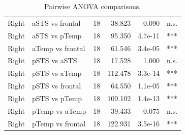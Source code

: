 \begin{table}[h]
\begin{tabular}{llrrrl}
 Right        & aSTS vs frontal  &   18 &   38.823 &     0.090 & n.s.   \\
 Right        & aSTS vs pTemp    &   18 &   95.350 &   4.7e-11 & ***    \\
 Right        & aTemp vs frontal &   18 &   61.546 &   3.4e-05 & ***    \\
 Right        & pSTS vs aSTS     &   18 &   17.528 &     1.000 & n.s.   \\
 Right        & pSTS vs aTemp    &   18 &  112.478 &   3.3e-14 & ***    \\
 Right        & pSTS vs frontal  &   18 &   64.550 &   1.1e-05 & ***    \\
 Right        & pSTS vs pTemp    &   18 &  109.102 &   1.4e-13 & ***    \\
 Right        & pTemp vs aTemp   &   18 &   39.433 &     0.075 & n.s.   \\
 Right        & pTemp vs frontal &   18 &  122.931 &   3.5e-16 & ***    \\
\bottomrule
\end{tabular}
\caption{Pairwise ANOVA comparisons.}
\end{table}